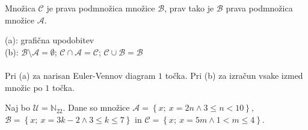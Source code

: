 \documentclass[addpoints]{exam}
\begin{document}
\begin{questions}
    \question
    Množica $\mathcal{C}$ je prava podmnožica množice $\mathcal{B}$, prav tako je $\mathcal{B}$ prava podmnožica množice $\mathcal{A}$.

    \begin{solution}[1cm]
        (a): grafična upodobitev \\
        (b): $\mathcal{B}\setminus\mathcal{A}=\emptyset$; $\mathcal{C}\cap\mathcal{A}=\mathcal{C}$; $\mathcal{C}\cup\mathcal{B}=\mathcal{B}$ \\ \\
        Pri (a) za narisan Euler-Vennov diagram $1$ točka. Pri (b) za izračun vsake izmed množic po $1$ točka.
    \end{solution}





    \question
    Naj bo $\mathcal{U}=\mathbb{N}_{22}$. Dane so množice $\mathcal{A}=\left\{x;\ x=2n \land 3\leq n<10\right\}$, $\mathcal{B}=\left\{x;\ x=3k-2 \land 3\leq k\leq 7\right\}$ in $\mathcal{C}=\left\{x;\ x=5m \land 1<m\leq 4\right\}$. 


\end{questions}
\end{document}
